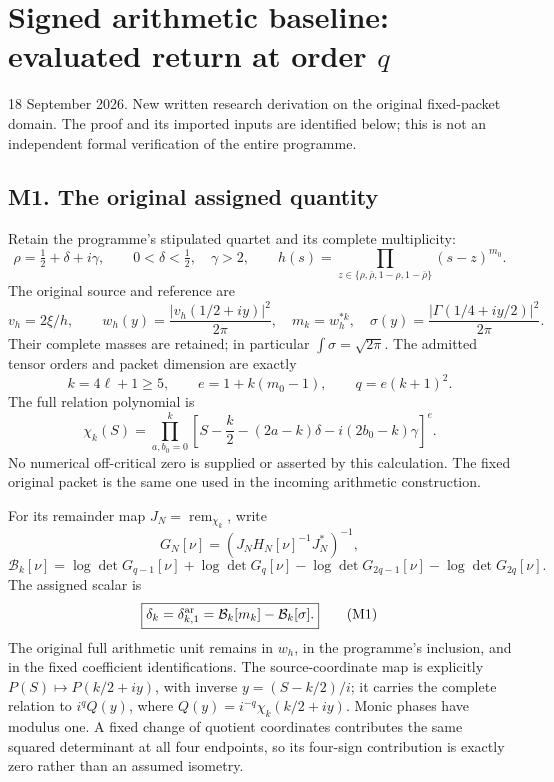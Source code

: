 \documentclass[
  11pt,
]{article}
\author{}
\date{}
\begin{document}
\section{\texorpdfstring{Signed arithmetic baseline: evaluated return at
order
\(q\)}{Signed arithmetic baseline: evaluated return at order q}}\label{signed-arithmetic-baseline-evaluated-return-at-order-q}

18 September 2026. New written research derivation on the original
fixed-packet domain. The proof and its imported inputs are identified
below; this is not an independent formal verification of the entire
programme.

\subsection{M1. The original assigned
quantity}\label{m1.-the-original-assigned-quantity}

Retain the programme's stipulated quartet and its complete multiplicity:
\[
\rho=\tfrac12+\delta+i\gamma,\qquad 0<\delta<\tfrac12,\quad\gamma>2,
\qquad h(s)=\prod_{z\in\{\rho,\bar\rho,1-\rho,1-\bar\rho\}}(s-z)^{m_0}.
\] The original source and reference are \[
v_h=2\xi/h,\qquad w_h(y)=\frac{|v_h(1/2+iy)|^2}{2\pi},
\quad m_k=w_h^{*k},\quad
\sigma(y)=\frac{|\Gamma(1/4+iy/2)|^2}{2\pi}.
\] Their complete masses are retained; in particular
\(\int\sigma=\sqrt{2\pi}\). The admitted tensor orders and packet
dimension are exactly \[
k=4\ell+1\ge5,\qquad e=1+k(m_0-1),\qquad q=e(k+1)^2.
\] The full relation polynomial is \[
\chi_k(S)=\prod_{a,b_0=0}^k
\left[S-\frac k2-(2a-k)\delta-i(2b_0-k)\gamma\right]^e.
\] No numerical off-critical zero is supplied or asserted by this
calculation. The fixed original packet is the same one used in the
incoming arithmetic construction.

For its remainder map \(J_N=\operatorname{rem}_{\chi_k}\), write \[
G_N[\nu]=(J_NH_N[\nu]^{-1}J_N^*)^{-1},
\] \[
\mathcal B_k[\nu]=\log\det G_{q-1}[\nu]+\log\det G_q[\nu]
-\log\det G_{2q-1}[\nu]-\log\det G_{2q}[\nu].
\] The assigned scalar is \[
\boxed{\delta_k=\delta_{k,1}^{\rm ar}
=\mathcal B_k[m_k]-\mathcal B_k[\sigma].}\tag{M1}
\] The original full arithmetic unit remains in \(w_h\), in the
programme's inclusion, and in the fixed coefficient identifications. The
source-coordinate map is explicitly \(P(S)\mapsto P(k/2+iy)\), with
inverse \(y=(S-k/2)/i\); it carries the complete relation to
\(i^qQ(y)\), where \(Q(y)=i^{-q}\chi_k(k/2+iy)\). Monic phases have
modulus one. A fixed change of quotient coordinates contributes the same
squared determinant at all four endpoints, so its four-sign contribution
is exactly zero rather than an assumed isometry.
\end{document}
